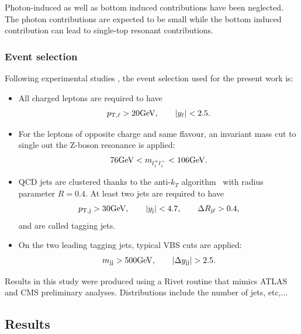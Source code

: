 \documentclass[11pt]{cernrep}
\newcommand{\MP}[1]{{ {\color{blue}{ [MP: #1]}} }}
\begin{document}
Photon-induced as well as bottom induced contributions have been neglected.
The photon contributions are expected to be small \cite{Biedermann:2017bss} while the bottom induced contribution can lead to single-top resonant contributions.

\subsubsection*{Event selection}

Following experimental studies \cite{Aad:2016ett,CMS-PAS-SMP-14-008}, the event selection used for the present work is:

\begin{itemize}
\item All charged leptons are required to have
    \begin{align}
        \label{cut:1}
         p_{\rm T, \ell} >  20{\rm GeV},\qquad |y_{\ell}| < 2.5.
    \end{align}
\item For the leptons of opposite charge and same flavour, an invariant mass cut to single out the Z-boson resonance is applied:
    \begin{align}
        \label{cut:2}
         76 {\rm GeV} < m_{l_i^+ l_i^-} < 106 {\rm GeV}.
    \end{align}

\item QCD jets are clustered thanks to the anti-$k_T$ algorithm~\cite{Cacciari:2008gp} with radius parameter $R=0.4$.
      At least two jets are required to have
        \begin{align}
        \label{cut:3}
         p_{\rm T, j} >  30{\rm GeV}, \qquad |y_{\rm j}| < 4.7, \qquad \Delta R_{\rm j \ell} > 0.4,
        \end{align}
        and are called tagging jets.
\item On the two leading tagging jets, typical VBS cuts are applied:
        \begin{align}
        \label{cut:4}
         m_{\rm j j} >  500{\rm GeV},\qquad |\Delta y_{\rm j j}| > 2.5.
        \end{align}
\end{itemize}

Results in this study were produced using a Rivet routine that
mimics ATLAS and CMS preliminary analyses. Distributions include the number of jets, etc,...
\MP{Add more details on this.}

\subsection{Results \label{vbs_results}}
\end{document}
